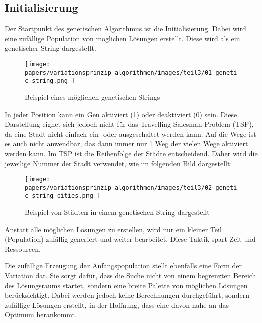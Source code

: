 %
%
%
%
\subsection{Initialisierung
\label{genetic_algorithm:initialization}}
Der Startpunkt des genetischen Algorithmus ist die Initialisierung.
Dabei wird eine zufällige Population von möglichen Lösungen erstellt.
Diese wird als ein genetischer String dargestellt.

\begin{figure}
	\centering
	\texttt{[image: 
        papers/variationsprinzip\_algorithmen/images/teil3/01\_genetic\_string.png
        ]}
	\caption{Beispiel eines möglichen genetischen Strings}
	\label{fig:possible_genetic_string}
\end{figure}

In jeder Position kann ein Gen aktiviert (1) oder deaktiviert (0) sein.
Diese Darstellung eignet sich jedoch nicht für das Travelling Salesman 
Problem (TSP), da eine Stadt nicht einfach ein- oder ausgeschaltet werden kann.
Auf die Wege ist es auch nicht anwendbar, das dann immer nur 1 Weg der vielen Wege 
aktiviert werden kann. Im TSP ist die Reihenfolge der Städte entscheidend. 
Daher wird die jeweilige Nummer der Stadt verwendet, wie im folgenden Bild 
\cite{cities_genetic_string} dargestellt:

\begin{figure}
	\centering
	\texttt{[image: 
        papers/variationsprinzip\_algorithmen/images/teil3/02\_genetic\_string\_cities.png
        ]}
	\caption{Beispiel von Städten in einem genetischen String dargestellt}
	\label{fig:cities_genetic_string}
\end{figure}

Anstatt alle möglichen Lösungen zu erstellen, wird nur ein kleiner Teil 
(Population) zufällig generiert und weiter bearbeitet. Diese Taktik 
spart Zeit und Ressourcen.

Die zufällige Erzeugung der Anfangspopulation stellt ebenfalls eine Form 
der Variation dar. Sie sorgt dafür, dass die Suche nicht von einem begrenzten 
Bereich des Lösungsraums startet, sondern eine breite Palette von möglichen 
Lösungen berücksichtigt. Dabei werden jedoch keine Berechnungen durchgeführt, 
sondern zufällige Lösungen erstellt, in der Hoffnung, dass eine davon nahe 
an das Optimum herankommt.

